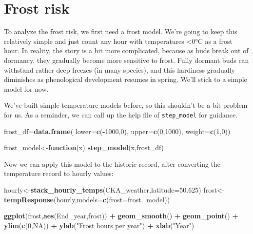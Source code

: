 \documentclass[
]{book}
\newenvironment{Shaded}{\begin{snugshade}}{\end{snugshade}}
\newcommand{\ControlFlowTok}[1]{\textcolor[rgb]{0.13,0.29,0.53}{\textbf{#1}}}
\newcommand{\DataTypeTok}[1]{\textcolor[rgb]{0.13,0.29,0.53}{#1}}
\newcommand{\DecValTok}[1]{\textcolor[rgb]{0.00,0.00,0.81}{#1}}
\newcommand{\FloatTok}[1]{\textcolor[rgb]{0.00,0.00,0.81}{#1}}
\newcommand{\KeywordTok}[1]{\textcolor[rgb]{0.13,0.29,0.53}{\textbf{#1}}}
\newcommand{\NormalTok}[1]{#1}
\newcommand{\OperatorTok}[1]{\textcolor[rgb]{0.81,0.36,0.00}{\textbf{#1}}}
\newcommand{\OtherTok}[1]{\textcolor[rgb]{0.56,0.35,0.01}{#1}}
\newcommand{\StringTok}[1]{\textcolor[rgb]{0.31,0.60,0.02}{#1}}
\begin{document}
\hypertarget{frost-risk}{%
\section{Frost risk}\label{frost-risk}}

To analyze the frost risk, we first need a frost model. We're going to keep this relatively simple and just count any hour with temperatures \textless0°C as a frost hour. In reality, the story is a bit more complicated, because as buds break out of dormancy, they gradually become more sensitive to frost. Fully dormant buds can withstand rather deep freezes (in many species), and this hardiness gradually diminishes as phenological development resumes in spring. We'll stick to a simple model for now.

We've built simple temperature models before, so this shouldn't be a bit problem for us. As a reminder, we can call up the help file of \texttt{step\_model} for guidance.

\begin{Shaded}
\begin{Highlighting}[]
\NormalTok{frost_df=}\KeywordTok{data.frame}\NormalTok{(}
  \DataTypeTok{lower=}\KeywordTok{c}\NormalTok{(}\OperatorTok{-}\DecValTok{1000}\NormalTok{,}\DecValTok{0}\NormalTok{),}
  \DataTypeTok{upper=}\KeywordTok{c}\NormalTok{(}\DecValTok{0}\NormalTok{,}\DecValTok{1000}\NormalTok{),}
  \DataTypeTok{weight=}\KeywordTok{c}\NormalTok{(}\DecValTok{1}\NormalTok{,}\DecValTok{0}\NormalTok{))}

\NormalTok{frost_model<-}\ControlFlowTok{function}\NormalTok{(x) }\KeywordTok{step_model}\NormalTok{(x,frost_df)}
\end{Highlighting}
\end{Shaded}

Now we can apply this model to the historic record, after converting the temperature record to hourly values:

\begin{Shaded}
\begin{Highlighting}[]
\NormalTok{hourly<-}\KeywordTok{stack_hourly_temps}\NormalTok{(CKA_weather,}\DataTypeTok{latitude=}\FloatTok{50.625}\NormalTok{)}
\NormalTok{frost<-}\KeywordTok{tempResponse}\NormalTok{(hourly,}\DataTypeTok{models=}\KeywordTok{c}\NormalTok{(}\DataTypeTok{frost=}\NormalTok{frost_model))}

\KeywordTok{ggplot}\NormalTok{(frost,}\KeywordTok{aes}\NormalTok{(End_year,frost)) }\OperatorTok{+}
\StringTok{  }\KeywordTok{geom_smooth}\NormalTok{() }\OperatorTok{+}
\StringTok{  }\KeywordTok{geom_point}\NormalTok{() }\OperatorTok{+}
\StringTok{  }\KeywordTok{ylim}\NormalTok{(}\KeywordTok{c}\NormalTok{(}\DecValTok{0}\NormalTok{,}\OtherTok{NA}\NormalTok{)) }\OperatorTok{+}
\StringTok{  }\KeywordTok{ylab}\NormalTok{(}\StringTok{"Frost hours per year"}\NormalTok{) }\OperatorTok{+}
\StringTok{  }\KeywordTok{xlab}\NormalTok{(}\StringTok{"Year"}\NormalTok{)}
\end{Highlighting}
\end{Shaded}
\end{document}
